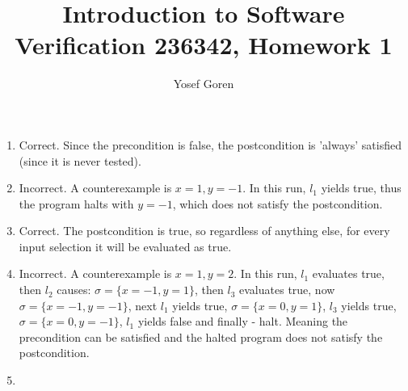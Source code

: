 \documentclass{article}
\begin{document}
\author{Yosef Goren}
\title{Introduction to Software Verification 236342, Homework 1}
\maketitle
\section{}
\begin{enumerate}[label=\Alph*.]
    \item Correct. Since the precondition is false, the postcondition is 'always' satisfied (since it is never tested).
    \item Incorrect. A counterexample is $x=1,y=-1$. In this run, $l_1$ yields true, thus
    the program halts with $y=-1$, which does not satisfy the postcondition.
    \item Correct. The postcondition is true, so regardless of anything else,
    for every input selection it will be evaluated as true.
    \item Incorrect. A counterexample is $x=1, y=2$. In this run,
    $l_1$ evaluates true, then $l_2$ causes: $\sigma=\{x=-1,y=1\}$,
    then $l_3$ evaluates true, now $\sigma=\{x=-1,y=-1\}$, next $l_1$
    yields true, $\sigma=\{x=0,y=1\}$, $l_3$ yields true,
    $\sigma=\{x=0,y=-1\}$, $l_1$ yields false and finally - halt.
    Meaning the precondition can be satisfied and the halted program 
    does not satisfy the postcondition.
    \item 
\end{enumerate}
\end{document}
